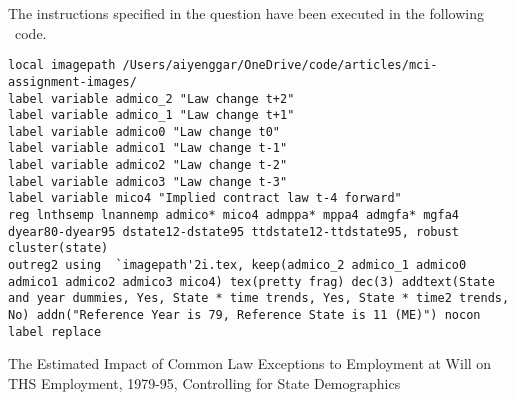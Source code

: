 \documentclass[12pt]{article}
\begin{document}
The instructions specified in the question have been executed in the following \stata \  code.\\
\begin{lstlisting}
local imagepath /Users/aiyenggar/OneDrive/code/articles/mci-assignment-images/
label variable admico_2 "Law change t+2"
label variable admico_1 "Law change t+1"
label variable admico0 "Law change t0"
label variable admico1 "Law change t-1"
label variable admico2 "Law change t-2"
label variable admico3 "Law change t-3"
label variable mico4 "Implied contract law t-4 forward"
reg lnthsemp lnannemp admico* mico4 admppa* mppa4 admgfa* mgfa4 dyear80-dyear95 dstate12-dstate95 ttdstate12-ttdstate95, robust cluster(state)
outreg2 using  `imagepath'2i.tex, keep(admico_2 admico_1 admico0 admico1 admico2 admico3 mico4) tex(pretty frag) dec(3) addtext(State and year dummies, Yes, State * time trends, Yes, State * time2 trends, No) addn("Reference Year is 79, Reference State is 11 (ME)") nocon label replace
\end{lstlisting}

\begin{table}
\caption{The Estimated Impact of Common Law Exceptions to Employment at Will on THS Employment, 1979-95, Controlling for State Demographics}

\label{2i}
\end{table}


\newpage
 

\end{document}
